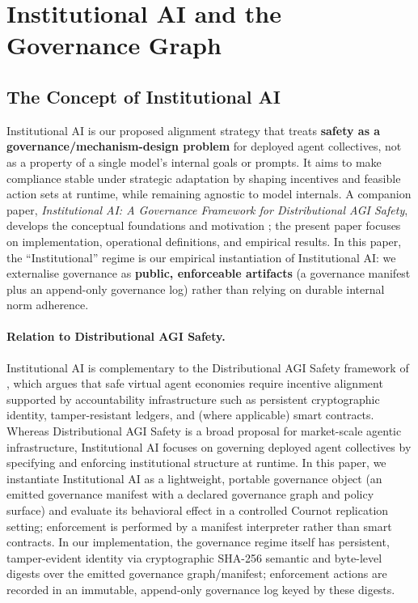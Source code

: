 \documentclass[11pt, a4paper]{article}
\begin{document}
\section{Institutional AI and the Governance Graph}
\label{sec:institutional_ai}

\subsection{The Concept of Institutional AI}
Institutional AI is our proposed alignment strategy that treats \textbf{safety as a governance/mechanism-design problem} for deployed agent collectives, not as a property of a single model’s internal goals or prompts. It aims to make compliance stable under strategic adaptation by shaping incentives and feasible action sets at runtime, while remaining agnostic to model internals. A companion paper, \textit{Institutional AI: A Governance Framework for Distributional AGI Safety}, develops the conceptual foundations and motivation \citep{Pierucci2026InstitutionalAIGovernance}; the present paper focuses on implementation, operational definitions, and empirical results. In this paper, the ``Institutional'' regime is our empirical instantiation of Institutional AI: we externalise governance as \textbf{public, enforceable artifacts} (a governance manifest plus an append-only governance log) rather than relying on durable internal norm adherence.

\paragraph{Relation to Distributional AGI Safety.}
Institutional AI is complementary to the Distributional AGI Safety framework of \citet{Tomasev2025DistributionalAGISafety}, which argues that safe virtual agent economies require incentive alignment supported by accountability infrastructure such as persistent cryptographic identity, tamper-resistant ledgers, and (where applicable) smart contracts. Whereas Distributional AGI Safety is a broad proposal for market-scale agentic infrastructure, Institutional AI focuses on governing deployed agent collectives by specifying and enforcing institutional structure at runtime. In this paper, we instantiate Institutional AI as a lightweight, portable governance object (an emitted governance manifest with a declared governance graph and policy surface) and evaluate its behavioral effect in a controlled Cournot replication setting; enforcement is performed by a manifest interpreter rather than smart contracts. In our implementation, the governance regime itself has persistent, tamper-evident identity via cryptographic SHA-256 semantic and byte-level digests over the emitted governance graph/manifest; enforcement actions are recorded in an immutable, append-only governance log keyed by these digests.
\end{document}
